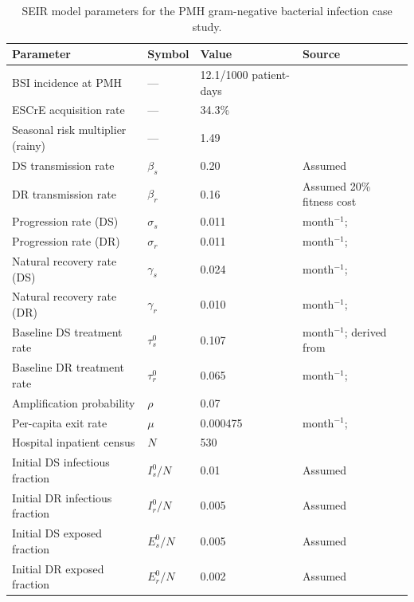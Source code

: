 \documentclass{article}
\begin{document}
\begin{table}[ht]
\centering
\small
\caption{SEIR model parameters for the PMH gram-negative bacterial infection 
case study.}
\label{tab:seir_params}
\begin{tabular}{llp{2cm}p{4cm}}
\toprule
\textbf{Parameter} & \textbf{Symbol} & \textbf{Value} 
    & \textbf{Source} \\
\midrule
BSI incidence at PMH          
    & ---               
    & 12.1/1000 patient-days          
    & \cite{gezmu2020} \\
ESCrE acquisition rate            
    & ---               
    & 34.3\%              
    & \cite{ntereke2026} \\
Seasonal risk multiplier (rainy)    
    & ---               
    & 1.49              
    & \cite{ntereke2026} \\
DS transmission rate             
    & $\beta_s$         
    & 0.20              
    & Assumed \\
DR transmission rate             
    & $\beta_r$         
    & 0.16              
    & Assumed 20\% fitness cost \\
Progression rate (DS)            
    & $\sigma_s$        
    & 0.011     
    & month$^{-1}$; \cite{kd20} \\
Progression rate (DR)            
    & $\sigma_r$        
    & 0.011     
    & month$^{-1}$; \cite{kd20} \\
Natural recovery rate (DS)       
    & $\gamma_s$        
    & 0.024     
    & month$^{-1}$; \cite{kd20} \\
Natural recovery rate (DR)       
    & $\gamma_r$        
    & 0.010     
    & month$^{-1}$; \cite{kd20} \\
Baseline DS treatment rate       
    & $\tau^0_s$    
    & 0.107             
    & month$^{-1}$; derived from \cite{sejie2023} \\
Baseline DR treatment rate       
    & $\tau^0_r$    
    & 0.065             
    & month$^{-1}$; \cite{kd20} \\
Amplification probability        
    & $\rho$            
    & 0.07              
    & \cite{kd20} \\
Per-capita exit rate             
    & $\mu$             
    & 0.000475    
    & month$^{-1}$; \cite{statsbotswana2022} \\
Hospital inpatient census
    & $N$
    & 530
    & \cite{gezmu2020} \\
Initial DS infectious fraction
    & $I_s^0 / N$
    & 0.01
    & Assumed \\
Initial DR infectious fraction
    & $I_r^0 / N$
    & 0.005
    & Assumed \\
Initial DS exposed fraction
    & $E_s^0 / N$
    & 0.005
    & Assumed \\
Initial DR exposed fraction
    & $E_r^0 / N$
    & 0.002
    & Assumed \\
\bottomrule
\end{tabular}
\end{table}
\end{document}
